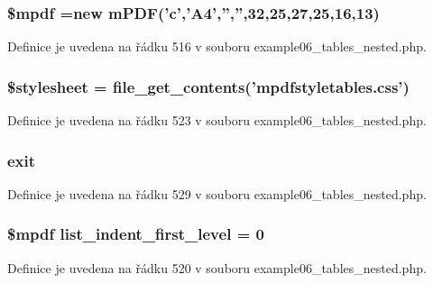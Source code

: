 \hypertarget{example06__tables__nested_8php_ad028f81910d6cbab9b184d2214b3a8f8}{
\subsubsection[{\$mpdf}]{\setlength{\rightskip}{0pt plus 5cm}\$mpdf =new {\bf m\-P\-D\-F}('c','A4','','',32,25,27,25,16,13)}}\label{example06__tables__nested_8php_ad028f81910d6cbab9b184d2214b3a8f8}


Definice je uvedena na řádku 516 v souboru example06\-\_\-tables\-\_\-nested.\-php.

\hypertarget{example06__tables__nested_8php_a19e5cf73e817c55a49205e6ec78c88a8}{
\subsubsection[{\$stylesheet}]{\setlength{\rightskip}{0pt plus 5cm}\$stylesheet = file\-\_\-get\-\_\-contents('mpdfstyletables.\-css')}}\label{example06__tables__nested_8php_a19e5cf73e817c55a49205e6ec78c88a8}


Definice je uvedena na řádku 523 v souboru example06\-\_\-tables\-\_\-nested.\-php.

\hypertarget{example06__tables__nested_8php_a6733eb5f605d09eaede9845835d71c4e}{
\subsubsection[{exit}]{\setlength{\rightskip}{0pt plus 5cm}exit}}\label{example06__tables__nested_8php_a6733eb5f605d09eaede9845835d71c4e}


Definice je uvedena na řádku 529 v souboru example06\-\_\-tables\-\_\-nested.\-php.

\hypertarget{example06__tables__nested_8php_a8780612514d14375709d0685d189579e}{
\subsubsection[{list\-\_\-indent\-\_\-first\-\_\-level}]{\setlength{\rightskip}{0pt plus 5cm}\$mpdf list\-\_\-indent\-\_\-first\-\_\-level = 0}}\label{example06__tables__nested_8php_a8780612514d14375709d0685d189579e}


Definice je uvedena na řádku 520 v souboru example06\-\_\-tables\-\_\-nested.\-php.

